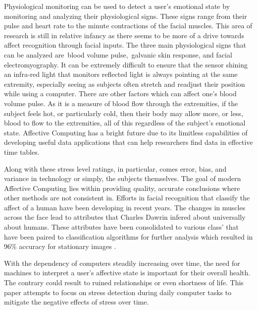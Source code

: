 Physiological monitoring can be used to detect a user’s emotional state by monitoring and analyzing their physiological signs. 
These signs range from their pulse and heart rate to the minute contractions of the facial muscles. This area of research is still 
in relative infancy as there seems to be more of a drive towards affect recognition through facial inputs. The three main physiological 
signs that can be analyzed are blood volume pulse, galvanic skin response, and facial electromyography. It can be extremely difficult 
to ensure that the sensor shining an infra-red light that monitors reflected light is always pointing at the same extremity, especially 
seeing as subjects often stretch and readjust their position while using a computer. There are other factors which can affect one's 
blood volume pulse. As it is a measure of blood flow through the extremities, if the subject feels hot, or particularly cold, then their 
body may allow more, or less, blood to flow to the extremities, all of this regardless of the subject's emotional state. 
Affective Computing has a bright future due to its limitless capabilities of developing useful data applications that can help 
researchers find data in effective time tables. 

Along with these stress level ratings, in particular, comes error, bias, and variance in technology or simply, the subjects themselves.
The goal of modern Affective Computing lies within providing quality, accurate conclusions where other methods are not 
consistent in. Efforts in facial recognition that classify the affect of a human have been developing in recent 
years. The changes in muscles across the face lead to attributes that Charles Dawrin infered about universally about 
humans. These attributes have been consolidated to various class' that have been paired to classification algorithms 
for further analysis which resulted in 96\% accuracy for stationary images \cite{facial-recognition}. 

With the dependency of computers steadily increasing over time, the need for machines to interpret a user's affective state 
is important for their overall health. The contrary could result to ruined relationships or even shortness of life. 
This paper attempts to focus on stress detection during daily computer tasks to mitigate the negative effects of 
stress over time. 
